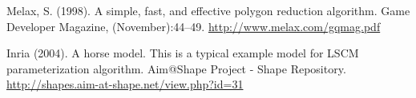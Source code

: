 \begin{thebibliography}{9}
  Melax, S. (1998). A simple, fast, and effective polygon reduction algorithm.
  Game Developer Magazine, (November):44–49.
  \url{http://www.melax.com/gqmag.pdf}

  Inria (2004). A horse model. This is a typical example model for LSCM
  parameterization algorithm.  Aim@Shape Project - Shape Repository.
  \url{http://shapes.aim-at-shape.net/view.php?id=31}
\end{thebibliography}
